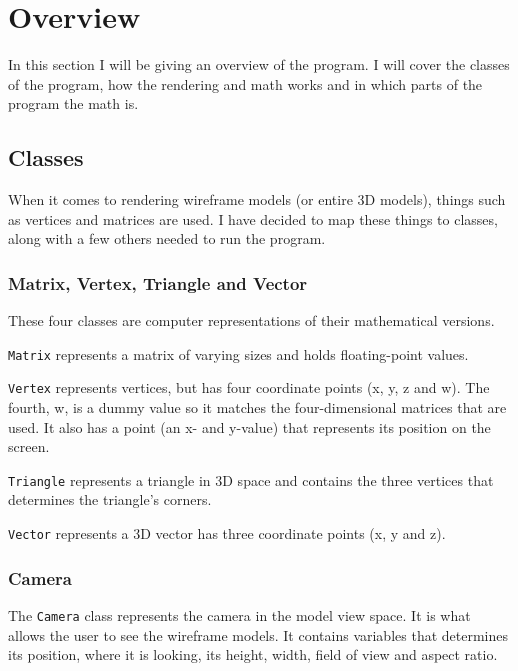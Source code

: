 \section{Overview}
\label{03}

In this section I will be giving an overview of the program. I will cover the classes of the program, how the rendering and math works and in which parts of the program the math is.

\subsection{Classes}
\label{03_01}
When it comes to rendering wireframe models (or entire 3D models), things such as vertices and matrices are used. I have decided to map these things to classes, along with a few others needed to run the program.

\subsubsection*{Matrix, Vertex, Triangle and Vector}
These four classes are computer representations of their mathematical versions. 
\begin{my_itemize}
	\item \texttt{Matrix} represents a matrix of varying sizes and holds floating-point values. 

	\item \texttt{Vertex} represents vertices, but has four coordinate points (x, y, z and w). The fourth, w, is a dummy value so it matches the four-dimensional matrices that are used. It also has a point (an x- and y-value) that represents its position on the screen.

	\item \texttt{Triangle} represents a triangle in 3D space and contains the three vertices that determines the triangle's corners.

	\item \texttt{Vector} represents a 3D vector has three coordinate points (x, y and z).
\end{my_itemize}

\subsubsection*{Camera}
The \texttt{Camera} class represents the camera in the model view space. It is what allows the user to see the wireframe models. It contains variables that determines its position, where it is looking, its height, width, field of view and aspect ratio.

